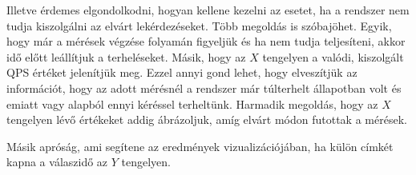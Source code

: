 Illetve érdemes elgondolkodni, hogyan kellene kezelni az esetet, ha a rendszer nem tudja kiszolgálni az elvárt lekérdezéseket. Több megoldás is szóbajöhet. Egyik, hogy már a mérések végzése folyamán figyeljük és ha nem tudja teljesíteni, akkor idő előtt leállítjuk a terheléseket. Másik, hogy az $X$ tengelyen a valódi, kiszolgált QPS értéket jelenítjük meg. Ezzel annyi gond lehet, hogy elveszítjük az információt, hogy az adott mérésnél a rendszer már túlterhelt állapotban volt és emiatt vagy alapból ennyi kéréssel terheltünk. Harmadik megoldás, hogy az $X$ tengelyen lévő értékeket addig ábrázoljuk, amíg elvárt módon futottak a mérések.

Másik apróság, ami segítene az eredmények vizualizációjában, ha külön címkét kapna a válaszidő az $Y$ tengelyen.  